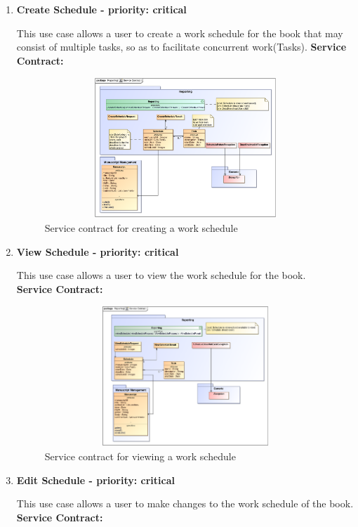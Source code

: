 \begin{enumerate}
\item \textbf{Create Schedule - priority: critical}
\par{This use case allows a user to create a work schedule for the book that may consist of multiple tasks, so as to facilitate concurrent work(Tasks).}
\textbf{Service Contract:} 
\begin{figure}[h]
\includegraphics[height=200px, width=500px]{epsImages/Reporting/createSchedule.eps}
\caption{Service contract for creating a work schedule}
\end{figure}
\newpage

\item \textbf{View Schedule - priority: critical}
\par{This use case allows a user to view the work schedule for the book.}\\
\textbf{Service Contract:} 
\begin{figure}[h]
\includegraphics[height=200px, width=500px]{epsImages/Reporting/viewSchedule.eps}
\caption{Service contract for viewing a work schedule}
\end{figure}


\item \textbf{Edit Schedule - priority: critical}
\par{This use case allows a user to make changes to the work schedule of the book.}\\
\textbf{Service Contract:} 


\end{enumerate}

